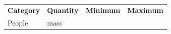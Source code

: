 {\begin{center}
\begin{xtabular*}{\mytablewidth}[t]{|p{10\mystarwidth}|p{10\mystarwidth}|p{10\mystarwidth}|p{10\mystarwidth}|}
                \textbf{Category}
               &
    
    
        
                \textbf{Quantity}
               &
    
    
        
                \textbf{Minimum}
               &
    
    
        
                \textbf{Maximum}
     \tabularnewline{}
    
    
        People &
    
    
        mass &
    
    
         &
    
    
     \tabularnewline{}
    

\end{xtabular*}
\end{center}}
